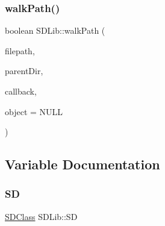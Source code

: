 \mbox{\label{namespace_s_d_lib_a319c3e0473e7947f3fb18a9d90b50f08}} 
\subsubsection{\texorpdfstring{walk\+Path()}{walkPath()}}
{\footnotesize\ttfamily boolean S\+D\+Lib\+::walk\+Path (\begin{DoxyParamCaption}\item[{const char $\ast$}]{filepath,  }\item[{\hyperlink{class_sd_file}{Sd\+File} \&}]{parent\+Dir,  }\item[{boolean($\ast$)(\hyperlink{class_sd_file}{Sd\+File} \&parent\+Dir, const char $\ast$file\+Path\+Component, boolean is\+Last\+Component, void $\ast$object)}]{callback,  }\item[{void $\ast$}]{object = {\ttfamily NULL} }\end{DoxyParamCaption})}



\subsection{Variable Documentation}
\mbox{\label{namespace_s_d_lib_a311ba8ede71ad9e1775f79a8f07a3728}} 
\subsubsection{\texorpdfstring{SD}{SD}}
{\footnotesize\ttfamily \hyperlink{class_s_d_lib_1_1_s_d_class}{S\+D\+Class} S\+D\+Lib\+::\+SD}

